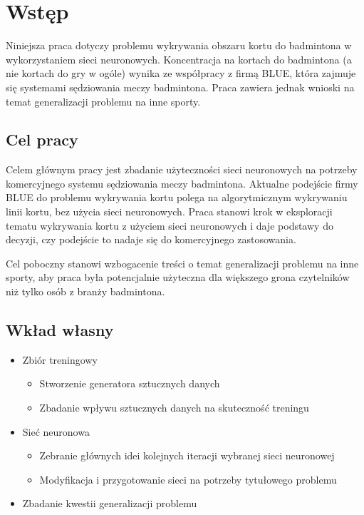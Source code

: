 \chapter{Wstęp}

Niniejsza praca dotyczy problemu wykrywania obszaru kortu do badmintona w wykorzystaniem sieci neuronowych.
Koncentracja na kortach do badmintona (a nie kortach do gry w ogóle) wynika ze współpracy z firmą BLUE, która zajmuje się systemami sędziowania meczy badmintona. Praca zawiera jednak wnioski na temat generalizacji problemu na inne sporty.

\section{Cel pracy}

Celem głównym pracy jest zbadanie użyteczności sieci neuronowych na potrzeby komercyjnego systemu sędziowania meczy badmintona. Aktualne podejście firmy BLUE do problemu wykrywania kortu polega na algorytmicznym wykrywaniu linii kortu, bez użycia sieci neuronowych. Praca stanowi krok w eksploracji tematu wykrywania kortu z użyciem sieci neuronowych i daje podstawy do decyzji, czy podejście to nadaje się do komercyjnego zastosowania.

Cel poboczny stanowi wzbogacenie treści o temat generalizacji problemu na inne sporty, aby praca była potencjalnie użyteczna dla większego grona czytelników niż tylko osób z branży badmintona.

\section{Wkład własny}

\begin{itemize}
	\item Zbiór treningowy
		\begin{itemize}
			\item Stworzenie generatora sztucznych danych
			\item Zbadanie wpływu sztucznych danych na skuteczność treningu
		\end{itemize}
	\item Sieć neuronowa
	\begin{itemize}
		\item Zebranie głównych idei kolejnych iteracji wybranej sieci neuronowej
		\item Modyfikacja i przygotowanie sieci na potrzeby tytułowego problemu
	\end{itemize}
	\item Zbadanie kwestii generalizacji problemu
\end{itemize}
